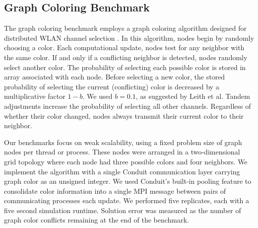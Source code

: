 \subsection{ Graph Coloring Benchmark } \label{sec:graph-coloring-benchmark}

The graph coloring benchmark employs a graph coloring algorithm designed for distributed WLAN channel selection \citep{leith2012wlan}.
In this algorithm, nodes begin by randomly choosing a color.
Each computational update, nodes test for any neighbor with the same color.
If and only if a conflicting neighbor is detected, nodes randomly select another color.
The probability of selecting each possible color is stored in array associated with each node.
Before selecting a new color, the stored probability of selecting the current (conflicting) color is decreased by a multiplicative factor $1 - b$.
We used $b=0.1$, as suggested by Leith et al.
Tandem adjustments increase the probability of selecting all other channels.
Regardless of whether their color changed, nodes always transmit their current color to their neighbor.

Our benchmarks focus on weak scalability, using a fixed problem size of  graph nodes per thread or process.
These nodes were arranged in a two-dimensional grid topology where each node had three possible colors and four neighbors.
We implement the algorithm with a single Conduit communication layer carrying graph color as an unsigned integer.
We used Conduit's built-in pooling feature to consolidate color information into a single MPI message between pairs of communicating processes each update.
We performed five replicates, each with a five second simulation runtime.
Solution error was measured as the number of graph color conflicts remaining at the end of the benchmark.
